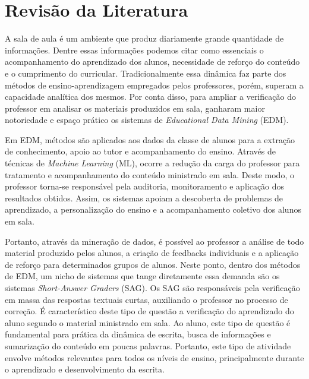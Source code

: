 \chapter{Revisão da Literatura}
\label{cap-literatura}


A sala de aula é um ambiente que produz diariamente grande quantidade de informações. Dentre essas informações podemos citar como essenciais o acompanhamento do aprendizado dos alunos, necessidade de reforço do conteúdo e o cumprimento do curricular. Tradicionalmente essa dinâmica faz parte dos métodos de ensino-aprendizagem empregados pelos professores, porém, superam a capacidade analítica dos mesmos. Por conta disso, para ampliar a verificação do professor em analisar os materiais produzidos em sala, ganharam maior notoriedade e espaço prático os sistemas de \textit{Educational Data Mining} (EDM).

Em EDM, métodos são aplicados aos dados da classe de alunos para a extração de conhecimento, apoio ao tutor e acompanhamento do ensino. Através de técnicas de \textit{Machine Learning} (ML), ocorre a redução da carga do professor para tratamento e acompanhamento do conteúdo ministrado em sala. Deste modo, o professor torna-se responsável pela auditoria, monitoramento e aplicação dos resultados obtidos. Assim, os sistemas apoiam a descoberta de problemas de aprendizado, a personalização do ensino e a acompanhamento coletivo dos alunos em sala. 

Portanto, através da mineração de dados, é possível ao professor a análise de todo material produzido pelos alunos, a criação de feedbacks individuais e a aplicação de reforço para determinados grupos de alunos. Neste ponto, dentro dos métodos de EDM, um nicho de sistemas que tange diretamente essa demanda são os sistemas \textit{Short-Answer Graders} (SAG). Os SAG são responsáveis pela verificação em massa das respostas textuais curtas, auxiliando o professor no processo de correção. É característico deste tipo de questão a verificação do aprendizado do aluno segundo o material ministrado em sala. Ao aluno, este tipo de questão é fundamental para prática da dinâmica de escrita, busca de informações e sumarização do conteúdo em poucas palavras. Portanto, este tipo de atividade envolve métodos relevantes para todos os níveis de ensino, principalmente durante o aprendizado e desenvolvimento da escrita.

